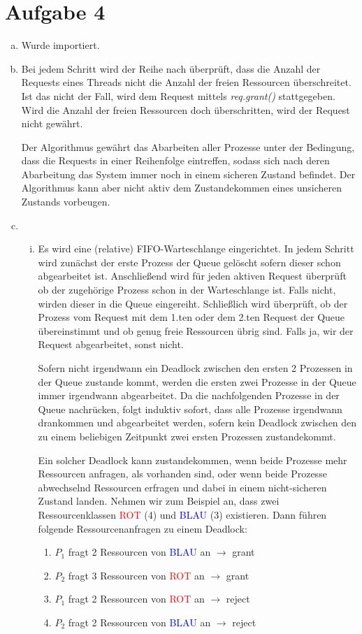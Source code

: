 \documentclass[numbers=noendperiod]{scrartcl}
\begin{document}
\section*{Aufgabe 4}

\begin{enumerate}[a)]
	\item Wurde importiert.
	\item Bei jedem Schritt wird der Reihe nach überprüft, dass die Anzahl der Requests eines Threads nicht die Anzahl der freien Ressourcen überschreitet. Ist das nicht der Fall, wird dem Request mittels \textit{req.grant()} stattgegeben. Wird die Anzahl der freien Ressourcen doch überschritten, wird der Request nicht gewährt.
	
	Der Algorithmus gewährt das Abarbeiten aller Prozesse unter der Bedingung, dass die Requests in einer Reihenfolge eintreffen, sodass sich nach deren Abarbeitung das System immer noch in einem sicheren Zustand befindet. Der Algorithmus kann aber nicht aktiv dem Zustandekommen eines unsicheren Zustands vorbeugen. 
	\item \begin{enumerate}[(i)]
	\item Es wird eine (relative) FIFO-Warteschlange eingerichtet. In jedem Schritt wird zunächst der erste Prozess der Queue gelöscht sofern dieser schon abgearbeitet ist. Anschließend wird für jeden aktiven Request überprüft ob der zugehörige Prozess schon in der Warteschlange ist. Falls nicht, wirden dieser in die Queue eingereiht. Schließlich wird überprüft, ob der Prozess vom Request mit dem 1.ten oder dem 2.ten Request der Queue übereinstimmt und ob genug freie Ressourcen übrig sind. Falls ja, wir der Request abgearbeitet, sonst nicht.

	Sofern nicht irgendwann ein Deadlock zwischen den ersten 2 Prozessen in der Queue zustande kommt, werden die ersten zwei Prozesse in der Queue immer irgendwann abgearbeitet. Da die nachfolgenden Prozesse in der Queue nachrücken, folgt induktiv sofort, dass alle Prozesse irgendwann drankommen und abgearbeitet werden, sofern kein Deadlock zwischen den zu einem beliebigen Zeitpunkt zwei ersten Prozessen zustandekommt.
	
	Ein solcher Deadlock kann zustandekommen, wenn beide Prozesse mehr Ressourcen anfragen, als vorhanden sind, oder wenn beide Prozesse abwechselnd Ressourcen erfragen und dabei in einem nicht-sicheren Zustand landen. Nehmen wir zum Beispiel an, dass zwei Ressourcenklassen \textcolor{red}{ROT} (4) und \textcolor{blue}{BLAU} (3) existieren. Dann führen folgende Ressourcenanfragen zu einem Deadlock:
	\begin{enumerate}[1.]
		\item $P_1$ fragt 2 Ressourcen von \textcolor{blue}{BLAU} an $\to$ grant
		\item $P_2$ fragt 3 Ressourcen von \textcolor{red}{ROT} an $\to$ grant
		\item $P_1$ fragt 2 Ressourcen von \textcolor{red}{ROT} an $\to$ reject
		\item $P_2$ fragt 2 Ressourcen von \textcolor{blue}{BLAU} an $\to$ reject
	\end{enumerate}


\end{enumerate}
\end{enumerate}
\end{document}
